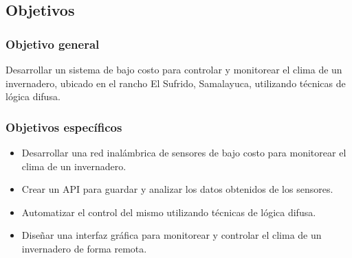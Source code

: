 \subsection{Objetivos}

\subsubsection{Objetivo general}
Desarrollar un sistema de bajo costo para controlar y monitorear el clima de un invernadero, ubicado en el rancho El Sufrido, Samalayuca, utilizando técnicas de lógica difusa.

\subsubsection{Objetivos específicos}
\begin{itemize}
	\item Desarrollar una red inalámbrica de sensores de bajo costo para monitorear el clima de un invernadero.
	\item Crear un API para guardar y analizar los datos obtenidos de los sensores.
	\item Automatizar el control del mismo utilizando técnicas de lógica difusa.
	\item Diseñar una interfaz gráfica para monitorear y controlar el clima de un invernadero de forma remota.
\end{itemize}